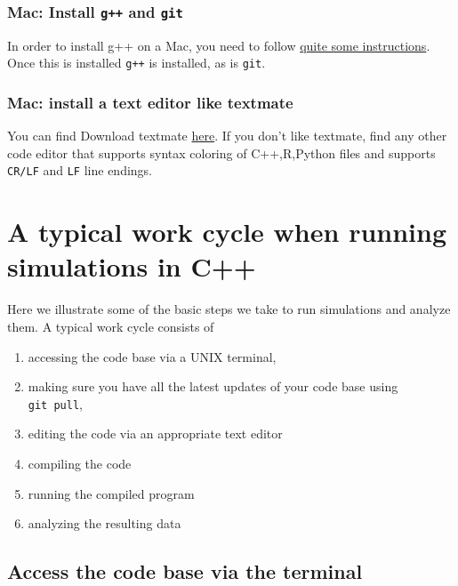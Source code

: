 \documentclass[
]{book}
\providecommand{\tightlist}{%
  \setlength{\itemsep}{0pt}\setlength{\parskip}{0pt}}
\begin{document}
\hypertarget{mac-install-g-and-git}{%
\subsection{\texorpdfstring{Mac: Install \texttt{g++} and \texttt{git}}{Mac: Install g++ and git}}\label{mac-install-g-and-git}}

In order to install g++ on a Mac, you need to follow \href{https://www.freecodecamp.org/news/install-xcode-command-line-tools/}{quite some instructions}. Once this is installed \texttt{g++} is installed, as is \texttt{git}.

\hypertarget{mac-install-a-text-editor-like-textmate}{%
\subsection{Mac: install a text editor like textmate}\label{mac-install-a-text-editor-like-textmate}}

You can find Download textmate \href{https://macromates.com/}{here}. If you don't like textmate, find any other code editor that supports syntax coloring of C++,R,Python files and supports \texttt{CR/LF} and \texttt{LF} line endings.

\hypertarget{a-typical-work-cycle-when-running-simulations-in-c}{%
\chapter{A typical work cycle when running simulations in C++}\label{a-typical-work-cycle-when-running-simulations-in-c}}

Here we illustrate some of the basic steps we take to run simulations and analyze them. A typical work cycle consists of

\begin{enumerate}
\def\labelenumi{\roman{enumi})}
\tightlist
\item
  accessing the code base via a UNIX terminal,
\item
  making sure you have all the latest updates of your code base using \texttt{git\ pull},
\item
  editing the code via an appropriate text editor
\item
  compiling the code
\item
  running the compiled program
\item
  analyzing the resulting data
\end{enumerate}

\hypertarget{access-the-code-base-via-the-terminal}{%
\section{Access the code base via the terminal}\label{access-the-code-base-via-the-terminal}}
\end{document}
